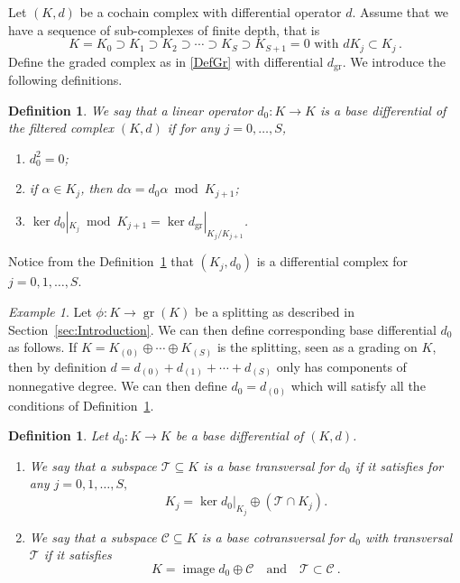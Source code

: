 \documentclass[10pt]{amsart}
\newcounter{dummy} \numberwithin{dummy}{section}
\newtheorem{definition}[dummy]{Definition}
\theoremstyle{remark}
\newtheorem{example}[dummy]{Example}
\newcommand{\calT}{\mathcal{T}}
\newcommand{\calC}{\mathcal{C}}
\DeclareMathOperator{\image}{image}
\DeclareMathOperator{\gr}{gr}
\numberwithin{equation}{section}
\begin{document}
Let $(K,d)$ be a cochain complex with differential operator $d$. Assume that we have a sequence of sub-complexes of finite depth, that is
\begin{equation} \label{filteredK} K = K_0 \supset K_1 \supset K_2 \supset \cdots \supset K_S \supset K_{S+1} =0\text{ with }dK_j\subset K_j\,.\end{equation}
Define the graded complex as in \eqref{DefGr} with differential $d_{\gr}$.
We introduce the following definitions.
\begin{definition} \label{def:base}
We say that a linear operator $d_0:K \to K$ is \emph{a base differential} of the filtered complex $(K,d)$ if for any $j =0, \dots, S$,
\begin{enumerate}[\rm (i)]
\item $d^2_0 = 0$;
\item if $\alpha \in K_j$, then $d \alpha = d_0 \alpha \bmod K_{j+1}$;
\item $\ker d_0|_{K_j} \bmod K_{j+1} = \ker d_{\gr} |_{K_j/K_{j+1}}$.
\end{enumerate}
\end{definition}
Notice from the Definition~\ref{def:base} that $(K_j, d_0)$ is a differential complex for $j =0, 1, \dots, S$.
\begin{example} \label{ex:phiTod0}
Let $\phi: K \to \gr(K)$ be a splitting as described in Section~\ref{sec:Introduction}. We can then define corresponding base differential $d_0$ as follows. If $K = K_{(0)} \oplus \cdots \oplus K_{(S)}$ is the splitting, seen as a grading on $K$, then by definition $d = d_{(0)} + d_{(1)} + \cdots + d_{(S)}$ only has components of nonnegative degree. We can then define $d_0 = d_{(0)}$ which will satisfy all the conditions of Definition~\ref{def:base}.
\end{example}
\begin{definition}
Let $d_0:K \to K$ be a base differential of $(K,d)$.
\begin{enumerate}[\rm (i)]
\item We say that a subspace $\calT \subseteq K$ is a base transversal for $d_0$ if it satisfies for any $j= 0,1, \dots, S,$
$$K_j = \ker d_0|_{K_j} \oplus (\calT \cap K_j).$$
\item We say that a subspace $\calC \subseteq K$ is a base cotransversal for $d_0$ with transversal $\calT$ if it satisfies
$$K = \image d_0 \oplus \calC\quad\text{and} \quad \calT \subset \calC\ .$$
\end{enumerate}
\end{definition}
\end{document}
